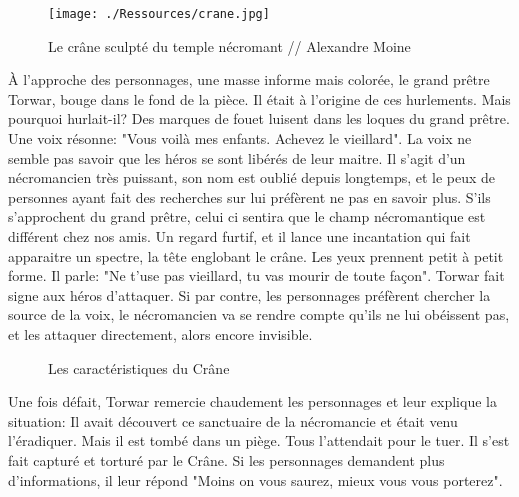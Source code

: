 \documentclass[a4paper]{article}
\begin{document}
\begin{figure}[ht]
\begin{center}
\hypertarget{crane}{}
\texttt{[image: ./Ressources/crane.jpg]}
\caption{Le crâne sculpté du temple nécromant // Alexandre Moine }
\end{center}
\end{figure}

À l'approche des personnages, une masse informe mais colorée, le grand prêtre Torwar, bouge dans le fond de la pièce. Il était à l'origine de ces hurlements. Mais pourquoi hurlait-il? Des marques de fouet luisent dans les loques du grand prêtre.
Une voix résonne: "Vous voilà mes enfants. Achevez le vieillard". La voix ne semble pas savoir que les héros se sont libérés de leur maitre. Il s'agit d'un nécromancien très puissant, son nom est oublié depuis longtemps, et le peux de personnes ayant fait des recherches sur lui préfèrent ne pas en savoir plus.
\newline
S'ils s'approchent du grand prêtre, celui ci sentira que le champ nécromantique est différent chez nos amis. Un regard furtif, et il lance une incantation qui fait apparaitre un spectre, la tête englobant le crâne. Les yeux prennent petit à petit forme. Il parle: "Ne t'use pas vieillard, tu vas mourir de toute façon". Torwar fait signe aux héros d'attaquer.
\newline
Si par contre, les personnages préfèrent chercher la source de la voix, le nécromancien va se rendre compte qu'ils ne lui obéissent pas, et les attaquer directement, alors encore invisible.
\newline
\begin{figure}[ht]
\begin{center}
\caption{Les caractéristiques du Crâne}
\end{center}
\end{figure}
Une fois défait, Torwar remercie chaudement les personnages et leur explique la situation: Il avait découvert ce sanctuaire de la nécromancie et était venu l'éradiquer. Mais il est tombé dans un piège. Tous l'attendait pour le tuer. Il s'est fait capturé et torturé par le Crâne. Si les personnages demandent plus d'informations, il leur répond "Moins on vous saurez, mieux vous vous porterez".
\end{document}
